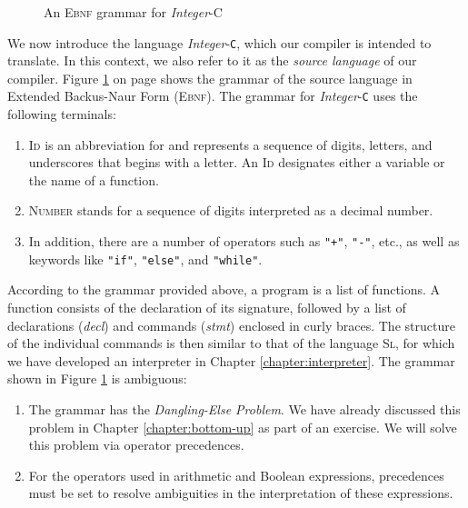 \begin{figure}[!ht]
\begin{center}
\begin{minipage}[t]{12.5cm}
  \end{minipage}
  \end{center}
  \caption{An \textsc{Ebnf} grammar for \textsl{Integer}-\textsc{C}}
\label{fig:compiler.ebnf}
\end{figure}

\noindent
We now introduce the language \textsl{Integer}-\texttt{C}, which our compiler is intended to translate. In this context, we also refer to it as the \emph{source language} of our compiler. Figure \ref{fig:compiler.ebnf} on page \pageref{fig:compiler.ebnf} shows the grammar of the source language in Extended Backus-Naur Form (\textsc{Ebnf}). The grammar for \textsl{Integer}-\texttt{C} uses the following terminals:
\begin{enumerate}
\item \textsc{Id} is an abbreviation for  and represents a sequence of digits, letters, and underscores that begins with a letter. An \textsc{Id} designates either a variable or the name of a function.
\item \textsc{Number} stands for a sequence of digits interpreted as a decimal number.
\item In addition, there are a number of operators such as \texttt{"+"}, \texttt{"-"}, etc., as well as keywords like \texttt{"if"}, \texttt{"else"}, and \texttt{"while"}.
\end{enumerate}
According to the grammar provided above, a program is a list of functions. A function consists of the declaration of its signature, followed by a list of declarations (\textsl{decl}) and commands (\textsl{stmt}) enclosed in curly braces. The structure of the individual commands is then similar to that of the language \textsc{Sl}, for which we have developed an interpreter in Chapter \ref{chapter:interpreter}. The grammar shown in Figure \ref{fig:compiler.ebnf} is ambiguous:
\begin{enumerate}
\item The grammar has the \emph{Dangling-Else Problem}. We have already discussed this problem in Chapter
      \ref{chapter:bottom-up} as part of an exercise. We will solve this problem via operator precedences. 
\item For the operators used in arithmetic and Boolean expressions, precedences must be set to resolve
      ambiguities in the interpretation of these expressions. 
\end{enumerate}

